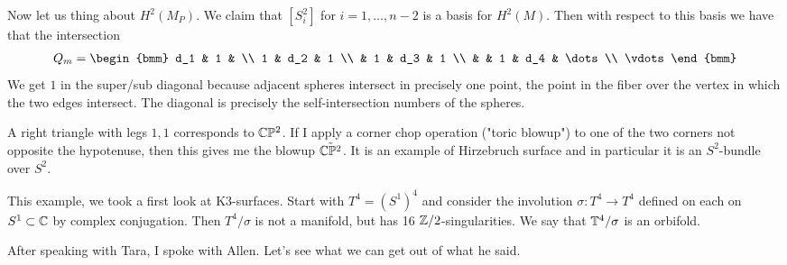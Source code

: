 \documentclass[12pt]{article}
\begin{document}
Now let us thing about $H^2(M_P)$. We claim that $[S^2_i]$ for $i=1,\dots,n-2$ is a basis for $H^2(M)$.  Then with respect to this basis we have that the intersection \begin{align*}
    Q_m = \begin{bmm}
        d_1 & 1 & \\
        1 & d_2 & 1 \\
         & 1 & d_3 & 1 \\
         &  & 1 & d_4 & \dots \\
        \vdots
    \end{bmm}
\end{align*} We get $1$ in the super/sub diagonal because adjacent spheres intersect in precisely one point, the point in the fiber over the vertex in which the two edges intersect. The diagonal is precisely the self-intersection numbers of the spheres.
\begin{example}
    A right triangle with legs $1,1$ corresponds to $\mathbb{C}\mathbb{P}^2$. If I apply a corner chop operation ("toric blowup") to one of the two corners not opposite the hypotenuse, then this gives me the blowup $\tilde{\mathbb{C}\mathbb{P}^2}$. It is an example of Hirzebruch surface  and in particular it is an $S^2$-bundle over $S^2$.
\end{example}

\begin{example}
This example, we took a first look at K3-surfaces. Start with $T^4 = (S^1)^4$ and consider the involution $\sigma:T^4\to T^4$ defined on each on $S^1\subset \mathbb{C}$ by complex conjugation. Then $T^4/\sigma$ is not a manifold, but has 16 $\mathbb{Z}/2$-singularities. We say that $\mathbb{T}^4/\sigma$ is an orbifold.
\end{example}


After speaking with Tara, I spoke with Allen. Let's see what we can get out of what he said.
\end{document}
